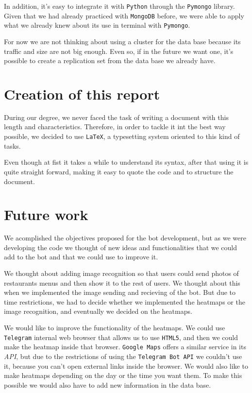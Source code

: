 \documentclass[oneside]{memoir}
\begin{document}
In addition, it's easy to integrate it with \texttt{Python} through the \texttt{Pymongo} library. Given that we had already practiced with \texttt{MongoDB} before, we were able to apply what we already knew about its use in terminal with \texttt{Pymongo}.

For now we are not thinking about using a cluster for the data base because its traffic and size are not big enough. Even so, if in the future we want one, it's possible to create a replication set from the data base we already have.

\section{Creation of this report}
During our degree, we never faced the task of writing a document with this length and characteristics. Therefore, in order to tackle it int the best way possible, we decided to use \texttt{LaTeX}, a typesetting system oriented to this kind of tasks.

Even though at fist it takes a while to understand its syntax, after that using it is quite straight forward, making it easy to quote the code and to structure the document.

\section{Future work}
We acomplished the objectives proposed for the bot development, but as we were developing the code we thought of new ideas and functionalities that we could add to the bot and that we could use to improve it.

We thought about adding image recognition so that users could send photos of restaurants menus and then show it to the rest of users. We thought about this when we implemented the image sending and recieving of the bot. But due to time restrictions, we had to decide whether we implemented the heatmaps or the image recognition, and eventually we decided on the heatmaps.

We would like to improve the functionality of the heatmaps. We could use \texttt{Telegram} internal web browser that allows us to use \texttt{HTML5}, and then we could make the heatmap inside that browser. \texttt{Google Maps} offers a similar service in its \textit{API}, but due to the restrictions of using the \texttt{Telegram Bot API} we couldn't use it, because you can't open external links inside the browser. We would also like to make heatmaps depending on the day or the time you want them. To make this possible we would also have to add new information in the data base.
\end{document}
